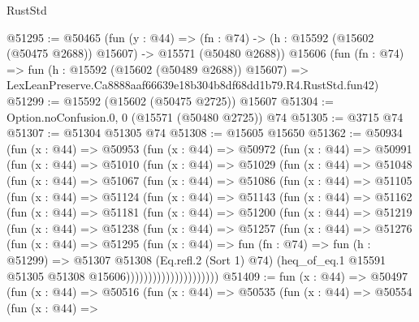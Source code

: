 \begin{lexlean}{RustStd}
\begin{coremodule}
@51295 := @50465
    (fun (y : @44) =>
    (fn : @74) -> (h : @15592 (@15602 (@50475 @2688)) @15607) -> @15571 (@50480 @2688))
    @15606
    (fun (fn : @74) =>
    fun (h : @15592 (@15602 (@50489 @2688)) @15607) =>
    LexLeanPreserve.Ca8888aaf66639e18b304b8df68dd1b79.R4.RustStd.fun42)
@51299 := @15592 (@15602 (@50475 @2725)) @15607
@51304 := Option.noConfusion.{0, 0} (@15571 (@50480 @2725)) @74
@51305 := @3715 @74
@51307 := @51304 @51305 @74
@51308 := @15605 @15650
@51362 := @50934
    (fun (x : @44) =>
    @50953
      (fun (x : @44) =>
      @50972
        (fun (x : @44) =>
        @50991
          (fun (x : @44) =>
          @51010
            (fun (x : @44) =>
            @51029
              (fun (x : @44) =>
              @51048
                (fun (x : @44) =>
                @51067
                  (fun (x : @44) =>
                  @51086
                    (fun (x : @44) =>
                    @51105
                      (fun (x : @44) =>
                      @51124
                        (fun (x : @44) =>
                        @51143
                          (fun (x : @44) =>
                          @51162
                            (fun (x : @44) =>
                            @51181
                              (fun (x : @44) =>
                              @51200
                                (fun (x : @44) =>
                                @51219
                                  (fun (x : @44) =>
                                  @51238
                                    (fun (x : @44) =>
                                    @51257
                                      (fun (x : @44) =>
                                      @51276
                                        (fun (x : @44) =>
                                        @51295
                                          (fun (x : @44) =>
                                          fun (fn : @74) =>
                                          fun (h : @51299) =>
                                          @51307
                                            @51308
                                            (Eq.refl.{2} (Sort 1) @74)
                                            (heq_of_eq.{1}
                                              @15591
                                              @51305
                                              @51308
                                              @15606)))))))))))))))))))))
@51409 := fun (x : @44) =>
  @50497
    (fun (x : @44) =>
    @50516
      (fun (x : @44) =>
      @50535
        (fun (x : @44) =>
        @50554
          (fun (x : @44) =>

\end{coremodule}
\end{lexlean}
